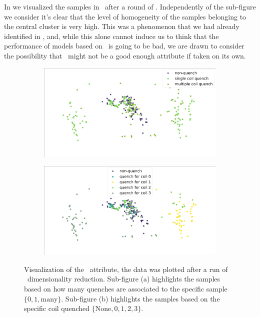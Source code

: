 In  we visualized the samples in \bn\ after a round of \pca. Independently
of the sub-figure we consider it's clear that the level of homogeneity of the samples belonging to
the central cluster is very high. This was a phenomenon that we had already identified in
, and, while this alone cannot induce us to think that the performance of models based
on \bn\ is going to be bad, we are drawn to consider the possibility that \bn\ might not be a good
enough attribute if taken on its own.
\begin{figure}[!ht]
	\centering
	\begin{subfigure}{0.6\linewidth}
		\centering
		\includegraphics[width=\linewidth]{img/quench_dist_qlp/single_vs_multiple_Bn.png}
		\subcaption{}
	\end{subfigure}
	\begin{subfigure}{0.6\linewidth}
		\centering
		\includegraphics[width=\linewidth]{img/quench_dist_qlp_bn.png}
		\subcaption{}
	\end{subfigure}
	\caption{Visualization of the \bn\ attribute, the data was plotted after a run of \pca\
		dimensionality reduction. Sub-figure (a) highlights the samples based on how many quenches
		are associated to the specific sample $\{0, 1, \text{many}\}$. Sub-figure (b) highlights the
		samples based on the specific coil quenched $\{\text{None}, 0, 1, 2, 3\}$.}
	\label{fig:bn-coilq-dist}
\end{figure}

